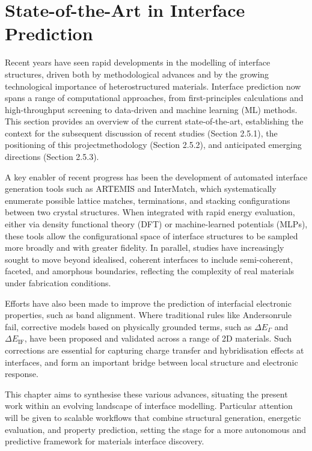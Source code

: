 \section{State-of-the-Art in Interface Prediction} \label{section:state_of_the_art}
 
Recent years have seen rapid developments in the modelling of interface structures, driven both by methodological advances and by the growing technological importance of heterostructured materials. Interface prediction now spans a range of computational approaches, from first-principles calculations and high-throughput screening to data-driven and machine learning (ML) methods. This section provides an overview of the current state-of-the-art, establishing the context for the subsequent discussion of recent studies (Section 2.5.1), the positioning of this project\rqss methodology (Section 2.5.2), and anticipated emerging directions (Section 2.5.3). 
 
A key enabler of recent progress has been the development of automated interface generation tools such as ARTEMIS and InterMatch, which systematically enumerate possible lattice matches, terminations, and stacking configurations between two crystal structures. When integrated with rapid energy evaluation, either via density functional theory (DFT) or machine-learned potentials (MLPs), these tools allow the configurational space of interface structures to be sampled more broadly and with greater fidelity. In parallel, studies have increasingly sought to move beyond idealised, coherent interfaces to include semi-coherent, faceted, and amorphous boundaries, reflecting the complexity of real materials under fabrication conditions. 
 
Efforts have also been made to improve the prediction of interfacial electronic properties, such as band alignment. Where traditional rules like Anderson\rqss rule fail, corrective models based on physically grounded terms, such as $\Delta E_{\Gamma}$ and $\Delta E_{\mathrm{IF}}$, have been proposed and validated across a range of 2D materials. Such corrections are essential for capturing charge transfer and hybridisation effects at interfaces, and form an important bridge between local structure and electronic response. 
 
This chapter aims to synthesise these various advances, situating the present work within an evolving landscape of interface modelling. Particular attention will be given to scalable workflows that combine structural generation, energetic evaluation, and property prediction, setting the stage for a more autonomous and predictive framework for materials interface discovery. 
 
